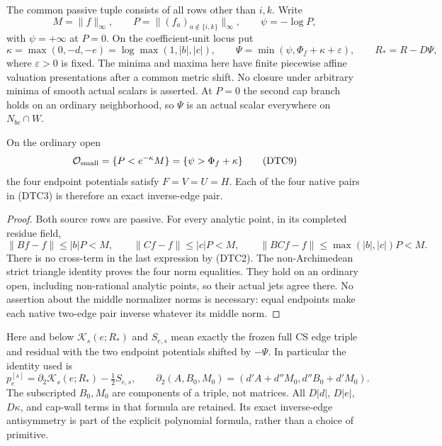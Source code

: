 The common passive tuple consists of all rows other than $i,k$.
Write
\[
 M=\|f\|_\infty,\qquad
 P=\|(f_a)_{a\notin\{i,k\}}\|_\infty,\qquad
 \psi=-\log P,
 \tag{DTC7}
\]
with $\psi=+\infty$ at $P=0$.  On the coefficient-unit locus put
\[
 \kappa=\max(0,-d,-e)=\log\max(1,|b|,|c|),\qquad
 \Psi=\min(\psi,\Phi_f+\kappa+\varepsilon),\qquad
 R_*=R-D\Psi,
 \tag{DTC8}
\]
where $\varepsilon>0$ is fixed.  The minima and maxima here have
finite piecewise affine valuation presentations after a common
metric shift.  No closure under arbitrary minima of smooth actual
scalars is asserted.  At $P=0$ the second cap branch holds on an
ordinary neighborhood, so $\Psi$ is an actual scalar everywhere
on $N_{bc}\cap W$.

\begin{lemma}
On the ordinary open
\[
 \mathcal O_{\rm small}=\{P<e^{-\kappa}M\}
                         =\{\psi>\Phi_f+\kappa\}
 \tag{DTC9}
\]
the four endpoint potentials satisfy $F=V=U=H$.  Each of the four
native pairs in (DTC3) is therefore an exact inverse-edge pair.
\end{lemma}

\begin{proof}
Both source rows are passive.  For every analytic point, in its
completed residue field,
\[
 \|Bf-f\|\le |b|P<M,\qquad
 \|Cf-f\|\le |c|P<M,
 \qquad
 \|BCf-f\|\le\max(|b|,|c|)P<M.
 \tag{DTC10}
\]
There is no cross-term in the last expression by (DTC2).  The
non-Archimedean strict triangle identity proves the four norm
equalities.  They hold on an ordinary open, including non-rational
analytic points, so their actual jets agree there.  No assertion
about the middle normalizer norms is necessary: equal endpoints
make each native two-edge pair inverse whatever its middle norm.
\end{proof}

Here and below $\mathcal K_s(e;R_*)$ and $S_{e,s}$ mean exactly
the frozen full CS edge triple and residual with the two endpoint
potentials shifted by $-\Psi$.  In particular the identity used is
\[
        p_e^{[s]}=\partial_2\mathcal K_s(e;R_*)-\tfrac12S_{e,s},
 \qquad
 \partial_2(A,B_0,M_0)=(d'A+d''M_0,d''B_0+d'M_0).
 \tag{DTC11}
\]
The subscripted $B_0,M_0$ are components of a triple, not matrices.
All $D|d|$, $D|e|$, $D\kappa$, and cap-wall terms in that formula
are retained.  Its exact inverse-edge antisymmetry is part of the
explicit polynomial formula, rather than a choice of primitive.


